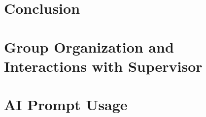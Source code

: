 \documentclass[12pt, a4paper]{report}
\begin{document}
\chapter*{Conclusion}




\appendix

\chapter{Group Organization and Interactions with Supervisor}

\chapter{AI Prompt Usage}

\listoffigures
\listoftables
\end{document}
